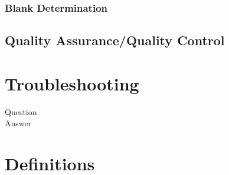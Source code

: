 \documentclass[12pt]{../SOP4_alpha}\usepackage[]{graphicx}\usepackage[]{color}
\begin{document}
\subsubsection{Blank Determination}

\subsection{Quality Assurance/Quality Control}

\section{Troubleshooting}

\NP Question \\
Answer

\section{Definitions}
\end{document}
